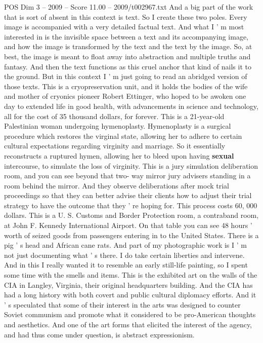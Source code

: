 \begin{textsample}{POS Dim 3 – 2009 – Score 11.00 – 2009/t002967.txt}
And a big part of the work that is sort of absent in this context is text.
So I create these two poles.
Every image is accompanied with a very detailed factual text.
And what I ' m most interested in is the invisible space between a text and its accompanying image, and how the image is transformed by the text and the text by the image.
So, at best, the image is meant to float away into abstraction and multiple truths and fantasy.
And then the text functions as this cruel anchor that kind of nails it to the ground.
But in this context I ' m just going to read an abridged version of those texts.
This is a cryopreservation unit, and it holds the bodies of the wife and mother of cryonics pioneer Robert Ettinger, who hoped to be awoken one day to extended life in good health, with advancements in science and technology, all for the cost of 35 thousand dollars, for forever.
This is a 21-year-old Palestinian woman undergoing hymenoplasty.
Hymenoplasty is a surgical procedure which restores the virginal state, allowing her to adhere to certain cultural expectations regarding virginity and marriage.
So it essentially reconstructs a ruptured hymen, allowing her to bleed upon having \textbf{sexual} intercourse, to simulate the loss of virginity.
This is a jury simulation deliberation room, and you can see beyond that two- way mirror jury advisers standing in a room behind the mirror.
And they observe deliberations after mock trial proceedings so that they can better advise their clients how to adjust their trial strategy to have the outcome that they ' re hoping for.
This process costs 60, 000 dollars.
This is a U.
S.
Customs and Border Protection room, a contraband room, at John F.
Kennedy International Airport.
On that table you can see 48 hours ' worth of seized goods from passengers entering in to the United States.
There is a pig ' s head and African cane rats.
And part of my photographic work is I ' m not just documenting what ' s there.
I do take certain liberties and intervene.
And in this I really wanted it to resemble an early still-life painting, so I spent some time with the smells and items.
This is the exhibited art on the walls of the CIA in Langley, Virginia, their original headquarters building.
And the CIA has had a long history with both covert and public cultural diplomacy efforts.
And it ' s speculated that some of their interest in the arts was designed to counter Soviet communism and promote what it considered to be pro-American thoughts and aesthetics.
And one of the art forms that elicited the interest of the agency, and had thus come under question, is abstract expressionism.

\end{textsample}
